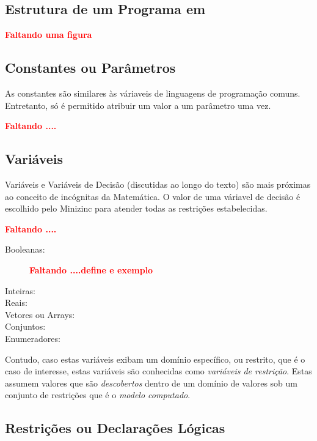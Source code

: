\subsection{Estrutura de um Programa em \minizinc}

{\bf \textcolor{red}{Faltando uma figura}}

\subsection{Constantes ou Parâmetros}



As constantes são similares às váriaveis de linguagens de programação comuns. Entretanto, só é permitido atribuir 
um valor a um parâmetro uma vez.

{\bf \textcolor{red}{Faltando ....}}

\subsection{Variáveis}

Variáveis e Variáveis de Decisão (discutidas ao longo do texto) são mais próximas ao conceito de incógnitas da Matemática. O valor de uma váriavel de decisão 
é escolhido pelo Minizinc para atender todas as restrições estabelecidas.


{\bf \textcolor{red}{Faltando ....}}


\begin{description}

  \item[Booleanas:] 
{\bf \textcolor{red}{Faltando ....define e exemplo}}
  
    \item[Inteiras:]
      \item[Reais:]
        \item[Vetores ou Arrays:]
                \item[Conjuntos:]
                
                \item[Enumeradores:]
\end{description}

Contudo, caso estas variáveis exibam um domínio
específico, ou restrito, que é o caso de interesse,
estas variáveis são conhecidas como
\textit{variáveis de restrição}.
Estas assumem valores que   são {\em descobertos} dentro de um domínio 
de valores sob um conjunto de restrições que 
é o  \textit{modelo  computado}.


\subsection{Restrições ou Declarações Lógicas}

